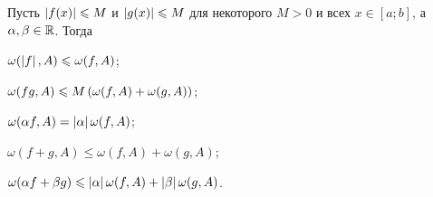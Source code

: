 \begin{proposal}
    Пусть $\left\lvert f(x)\right\rvert \leqslant M$ и $\left\lvert g(x)\right\rvert \leqslant M$ для некоторого $M > 0$ и всех $x \in [a; b]$, а $\alpha, \beta \in \mathbb{R}$. Тогда
    \begin{enumerate}
        \begin{minipage}{.5\textwidth}
            \item $\omega(\left\lvert f\right\rvert, A) \leqslant \omega(f, A)$;
            \item $\omega(fg, A) \leqslant M\left(\omega(f, A) + \omega(g, A)\right)$;
            \item $\omega(\alpha f, A) = \left\lvert\alpha\right\rvert\omega(f, A)$;
        \end{minipage}
        \begin{minipage}[b]{.5\textwidth}
            \item $\omega(f + g, A) \leqslant \omega(f, A) + \omega(g, A)$;
            \item $\omega(\alpha f + \beta g) \leqslant \left\lvert\alpha\right\rvert\omega(f, A) + \left\lvert\beta\right\rvert\omega(g, A)$.
        \end{minipage}
    \end{enumerate}
\end{proposal}


